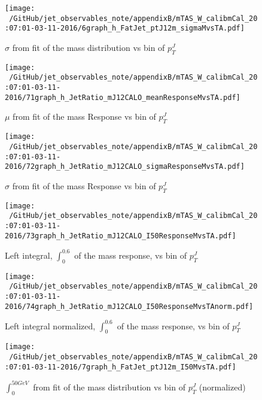 \begin{figure}

\texttt{[image: ~/GitHub/jet\_observables\_note/appendixB/mTAS\_W\_calibmCal\_20:07:01-03-11-2016/6graph\_h\_FatJet\_ptJ12m\_sigmaMvsTA.pdf]}
\caption{$\sigma$ from fit of the mass distribution vs bin of $p_{T}^{J}$ }

\end{figure}

\clearpage

\begin{figure}

\texttt{[image: ~/GitHub/jet\_observables\_note/appendixB/mTAS\_W\_calibmCal\_20:07:01-03-11-2016/71graph\_h\_JetRatio\_mJ12CALO\_meanResponseMvsTA.pdf]}
\caption{$\mu $ from fit of the mass Response vs bin of  $p_{T}^{J}$}

\end{figure}
\begin{figure}

\texttt{[image: ~/GitHub/jet\_observables\_note/appendixB/mTAS\_W\_calibmCal\_20:07:01-03-11-2016/72graph\_h\_JetRatio\_mJ12CALO\_sigmaResponseMvsTA.pdf]}
\caption{$\sigma $ from fit of the mass Response vs bin of $p_{T}^{J}$}

\end{figure}

\begin{figure}

\texttt{[image: ~/GitHub/jet\_observables\_note/appendixB/mTAS\_W\_calibmCal\_20:07:01-03-11-2016/73graph\_h\_JetRatio\_mJ12CALO\_I50ResponseMvsTA.pdf]}
\caption{Left integral, $\int_{0}^{0.6} $ of the mass response, vs bin of  $p_{T}^{J}$}

\end{figure}

\begin{figure}

\texttt{[image: ~/GitHub/jet\_observables\_note/appendixB/mTAS\_W\_calibmCal\_20:07:01-03-11-2016/74graph\_h\_JetRatio\_mJ12CALO\_I50ResponseMvsTAnorm.pdf]}
\caption{Left integral normalized, $\int_{0}^{0.6} $ of the mass response, vs bin of  $p_{T}^{J}$}

\end{figure}

\begin{figure}

\texttt{[image: ~/GitHub/jet\_observables\_note/appendixB/mTAS\_W\_calibmCal\_20:07:01-03-11-2016/7graph\_h\_FatJet\_ptJ12m\_I50MvsTA.pdf]}
\caption{$\int_{0}^{50 GeV}$ from fit of the mass distribution vs bin of $p_{T}^{J}$ (normalized)}

\end{figure}

